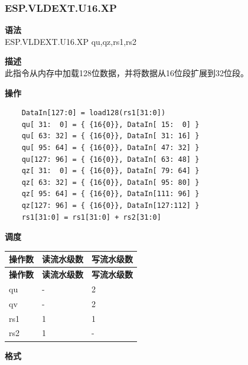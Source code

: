 \newpage

\newpage
\subsubsection{ESP.VLDEXT.U16.XP}\label{instruction:ESPVLDEXTU16XP}
\textbf{语法}\\
ESP.VLDEXT.U16.XP qu,qz,rs1,rs2

\textbf{描述}\\
此指令从内存中加载128位数据，并将数据从16位段扩展到32位段。

\textbf{操作}\\
\begin{lstlisting}
    DataIn[127:0] = load128(rs1[31:0])
    qu[ 31:  0] = { {16{0}}, DataIn[ 15:  0] }
    qu[ 63: 32] = { {16{0}}, DataIn[ 31: 16] }
    qu[ 95: 64] = { {16{0}}, DataIn[ 47: 32] }
    qu[127: 96] = { {16{0}}, DataIn[ 63: 48] }
    qz[ 31:  0] = { {16{0}}, DataIn[ 79: 64] }
    qz[ 63: 32] = { {16{0}}, DataIn[ 95: 80] }
    qz[ 95: 64] = { {16{0}}, DataIn[111: 96] }
    qz[127: 96] = { {16{0}}, DataIn[127:112] }
    rs1[31:0] = rs1[31:0] + rs2[31:0]
\end{lstlisting}

\textbf{调度}\\
\begin{longtable}[c]{|l|l|l|}
    \hline
    \rowcolor{lightgray}
    \textbf{操作数} & \textbf{读流水级数} & \textbf{写流水级数} \\\hline
    \endfirsthead
    \hline
    \rowcolor{lightgray}
     \textbf{操作数} & \textbf{读流水级数} & \textbf{写流水级数} \\\hline
    \endhead
    \hline
    \endfoot

  qu & - & 2 \\\hline
  qv & - & 2 \\\hline
  rs1 & 1 & 1 \\\hline
    rs2 & 1 & -

\end{longtable}

\textbf{格式}\\

